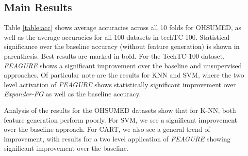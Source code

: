 \documentclass{article}
\theoremstyle{definition}
\begin{document}

	
	


\subsection{Main Results}

Table \ref{table:acc} shows average accuracies across all 10 folds for OHSUMED, as well as the average accuracies for all 100 datasets in techTC-100. Statistical significance over the baseline accuracy (without feature generation) is shown in parenthesis. Best results are marked in bold.
For the TechTC-100 dataset, \emph{FEAGURE} shows a significant improvement over the baseline and unsupervised approaches.%
Of particular note are the results for KNN and SVM, where the two level activation of \emph{FEAGURE} shows statistically significant improvement over \emph{Expander-FG} as well as the baseline accuracy. 

Analysis of the results for the OHSUMED datasets show that for K-NN, both feature generation perform poorly. For SVM, we see a significant improvement over the baseline approach. For CART, we also see a general trend of improvement, with results for a two level application of \emph{FEAGURE} showing significant improvement over the baseline.
\end{document}
